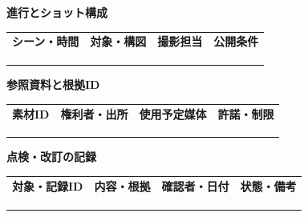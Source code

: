 \documentclass[11pt,a4paper]{article}
\begin{document}
\par{}\noindent\textbf{進行とショット構成}\par\vspace{1mm}
{\fontsize{8.5}{13}\selectfont
\begin{tabularx}{\linewidth}{@{}XXXX@{}}
\textbf{シーン・時間} & \textbf{対象・構図} & \textbf{撮影担当} & \textbf{公開条件}\\[2mm]
\strut & \strut & \strut & \strut\\[5mm]
\strut & \strut & \strut & \strut\\[5mm]
\strut & \strut & \strut & \strut\\[5mm]
\end{tabularx}
}\vspace{2mm}\par
{}
\par{}\noindent\textbf{参照資料と根拠ID}\par\vspace{1mm}
{\fontsize{8.5}{13}\selectfont
\begin{tabularx}{\linewidth}{@{}XXXX@{}}
\textbf{素材ID} & \textbf{権利者・出所} & \textbf{使用予定媒体} & \textbf{許諾・制限}\\[2mm]
\strut & \strut & \strut & \strut\\[5mm]
\strut & \strut & \strut & \strut\\[5mm]
\strut & \strut & \strut & \strut\\[5mm]
\end{tabularx}
}\vspace{2mm}\par
{}
\par{}\noindent\textbf{点検・改訂の記録}\par\vspace{1mm}
{\fontsize{8.5}{13}\selectfont
\begin{tabularx}{\linewidth}{@{}XXXX@{}}
\textbf{対象・記録ID} & \textbf{内容・根拠} & \textbf{確認者・日付} & \textbf{状態・備考}\\[2mm]
\strut & \strut & \strut & \strut\\[5mm]
\strut & \strut & \strut & \strut\\[5mm]
\strut & \strut & \strut & \strut\\[5mm]
\end{tabularx}
}\vspace{2mm}\par
\end{document}

